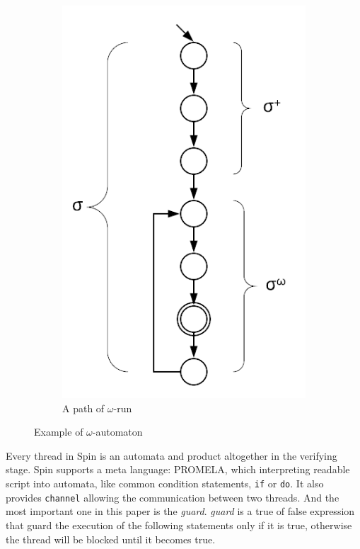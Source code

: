 \begin{figure}
\begin{subfigure}[b]{0.16\textwidth}
\includegraphics[width=\textwidth]{img/buchi}
\caption{A path of $\omega$-run}
\label{fig:buchi}
\end{subfigure}
\caption{Example of $\omega$-automaton}
\end{figure}

Every thread in Spin is an automata and product altogether in the verifying stage. Spin supports a meta language: PROMELA, which interpreting readable script into automata, like common condition statements, \texttt{if} or \texttt{do}. It also provides \texttt{channel} allowing the communication between two threads. And the most important one in this paper is the \textit{guard}. \textit{guard} is a true of false expression that guard the execution of the following statements only if it is true, otherwise the thread will be blocked until it becomes true.

